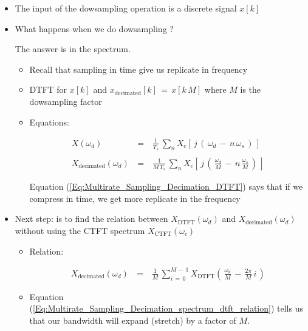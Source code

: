 \documentclass[12pt,a4paper]{book}
\begin{document}
\begin{itemize}

\item The input of the dowsampling operation is a discrete signal $x[k]$

\item What happens when we do dowsampling ?

The answer is in the spectrum.

\begin{itemize}
\item Recall that sampling in time give us replicate in frequency

\item DTFT for $x[k]$ and $x_{\text{decimated}}[k] \, = \, x[k \, M]$ where $M$ is the dowsampling factor


\item Equations:

\begin{equation}
\begin{array}{rcl}
X(\omega_d) \, &=& \, \displaystyle\frac{1}{T_s} \, \displaystyle\sum_n X_c \left[\, j \, \left(\, \omega_d \, - \, n \, \omega_s \,\right)  \,\right] \\ \\
X_{\text{decimated}}(\omega_d) \, &=& \, \displaystyle\frac{1}{M \, T_s} \, \displaystyle\sum_n X_c \left[\, j \, \left(\,  \displaystyle\frac{\omega_d}{M}  \, - \, n \,  \displaystyle\frac{\omega_s}{M} \,\right)  \,\right] 
\end{array}
\label{Eq:Multirate_Sampling_Decimation_spectrum_relation}
\end{equation}

Equation (\ref{Eq:Multirate_Sampling_Decimation_DTFT}) says that if we compress in time, we get more replicate in the frequency


\end{itemize}

\item Next step: is to find the relation between $X_{\text{DTFT}}(\omega_d) $ and $X_{\text{decimated}}(\omega_d) $ without using the CTFT spectrum $X_{\text{CTFT}}(\omega_c)$
	
	\begin{itemize}
	\item Relation:
	
	\begin{equation}
	\begin{array}{rcl}
		X_{\text{decimated}}(\omega_d) \, &=& \, \displaystyle	\frac{1}{M} \, \displaystyle\sum_{i \, = \, 0}^{M \, - \, 1} X_{\text{DTFT}} \left(\,  \displaystyle\frac{\omega_d}{M} \, - \, \displaystyle\frac{2 \pi}{M} \, i \,\right)   
	\end{array}	\label{Eq:Multirate_Sampling_Decimation_spectrum_dtft_relation}
	\end{equation}		
	
	\item Equation (\ref{Eq:Multirate_Sampling_Decimation_spectrum_dtft_relation}) tells us that our bandwidth will expand (stretch) by a factor of $M$.

	\end{itemize}


\end{itemize}
\end{document}
